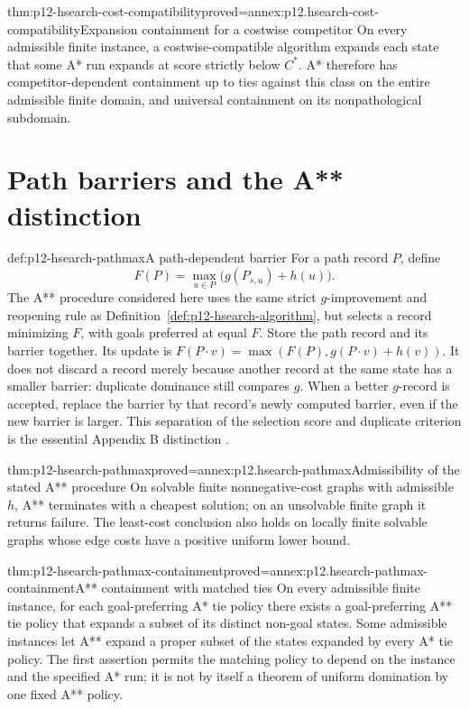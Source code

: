 \begin{hbtheorem}{thm:p12-hsearch-cost-compatibility}{proved=annex:p12.hsearch-cost-compatibility}{Expansion containment for a costwise competitor}
On every admissible finite instance, a costwise-compatible algorithm
expands each state that some A* run expands at score strictly below
\(C^*\). A* therefore has competitor-dependent containment up to
ties against this class on the entire admissible finite domain, and
universal containment on its nonpathological subdomain.
\end{hbtheorem}

\section{Path barriers and the A** distinction}

\begin{hbdefinition}{def:p12-hsearch-pathmax}{A path-dependent barrier}
For a path record \(P\), define
\[
 F(P)=\max_{u\in P}\bigl(g(P_{s,u})+h(u)\bigr).
\]
The A** procedure considered here uses the same strict \(g\)-improvement
and reopening rule as Definition~\ref{def:p12-hsearch-algorithm}, but
selects a record minimizing \(F\), with goals preferred at equal
\(F\). Store the path record and its barrier together. Its update is
\(F(P\cdot v)=\max(F(P),g(P\cdot v)+h(v))\).
It does not discard a record merely because another record at the same
state has a smaller barrier: duplicate dominance still compares \(g\).
When a better \(g\)-record is accepted, replace the barrier by that
record's newly computed barrier, even if the new barrier is larger.
This separation of the selection score and duplicate criterion is the
essential Appendix B distinction \cite[pp.~534--535]{DechterPearl1985BestFirst}.
\end{hbdefinition}

\begin{hbtheorem}{thm:p12-hsearch-pathmax}{proved=annex:p12.hsearch-pathmax}{Admissibility of the stated A** procedure}
On solvable finite nonnegative-cost graphs with admissible \(h\), A**
terminates with a cheapest solution; on an unsolvable finite graph it
returns failure. The least-cost conclusion also holds on locally finite
solvable graphs whose edge costs have a positive uniform lower bound.
\end{hbtheorem}

\begin{hbtheorem}{thm:p12-hsearch-pathmax-containment}{proved=annex:p12.hsearch-pathmax-containment}{A** containment with matched ties}
On every admissible finite instance, for each goal-preferring A* tie
policy there exists a goal-preferring A** tie policy that expands a
subset of its distinct non-goal states. Some admissible instances let
A** expand a proper subset of the states expanded by every A* tie
policy. The first assertion permits the matching policy to depend on
the instance and the specified A* run; it is not by itself a theorem
of uniform domination by one fixed A** policy.
\end{hbtheorem}

